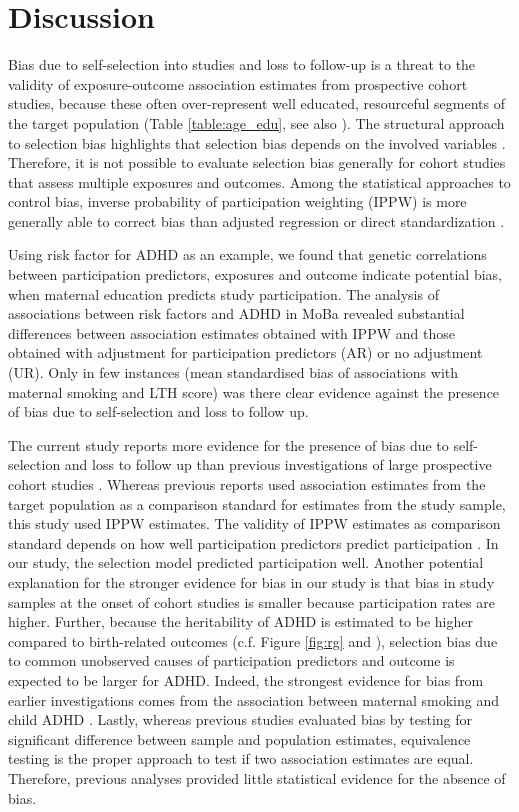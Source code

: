 \documentclass[12pt]{article}
\begin{document}
\section{Discussion}
Bias due to self-selection into studies and loss to follow-up is a threat to the validity of exposure-outcome association estimates from prospective cohort studies, because these often over-represent well educated, resourceful segments of the target population (Table \ref{table:age_edu}, see also \cite{Vinther-Larsen2010-hq, Galea2007-hv, Howe2013-vv}). The structural approach to selection bias highlights that selection bias depends on the involved variables \cite{Hernan2004-oz}. Therefore, it is not possible to evaluate selection bias generally for cohort studies that assess multiple exposures and outcomes. Among the statistical approaches to control bias, inverse probability of participation weighting (IPPW) is more generally able to correct bias than adjusted regression or direct standardization \cite{Hernan2004-oz}.

Using risk factor for ADHD as an example, we found that genetic correlations between participation predictors, exposures and outcome indicate potential bias, when maternal education predicts study participation. The analysis of associations between risk factors and ADHD in MoBa revealed substantial differences between association estimates obtained with IPPW and those obtained with adjustment for participation predictors (AR) or no adjustment (UR). Only in few instances (mean standardised bias of associations with maternal smoking and LTH score) was there clear evidence against the presence of bias due to self-selection and loss to follow up.

The current study reports more evidence for the presence of bias due to self-selection and loss to follow up than previous investigations of large prospective cohort studies \cite{Nilsen2009-ci, Nohr2006-uf,Greene2011-am, Wolke2009-lu}. Whereas previous reports used association estimates from the target population as a comparison standard for estimates from the study sample, this study used IPPW estimates. The validity of IPPW estimates as comparison standard depends on how well participation predictors predict participation \cite{Seaman2013-rj}. In our study, the selection model predicted participation well. Another potential explanation for the stronger evidence for bias in our study is that bias in study samples at the onset of cohort studies is smaller because participation rates are higher. Further, because the heritability of ADHD is estimated to be higher compared to birth-related outcomes (c.f. Figure \ref{fig:rg} and \cite{Wu2015-bg}), selection bias due to common unobserved causes of participation predictors and outcome is expected to be larger for ADHD. Indeed, the strongest evidence for bias from earlier investigations comes from the association between maternal smoking and child ADHD \cite{Greene2011-am}. Lastly, whereas previous studies evaluated bias by testing for significant difference between sample and population estimates, equivalence testing \cite{Schuirmann1987-ip, Mascha2011-um} is the proper approach to test if two association estimates are equal. Therefore, previous analyses provided little statistical evidence for the absence of bias. 
\end{document}
